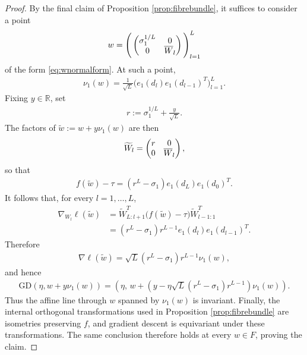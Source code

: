 \documentclass{article}
\newcommand{\RB}{\mathbb{R}}
\newcommand{\GD}{\mathrm{GD}}
\newcommand{\bW}{\smash{\overline{W}}\vphantom{W}}
\theoremstyle{plain}
\theoremstyle{definition}
\theoremstyle{remark}
\begin{document}
\begin{proof}
    By the final claim of Proposition \ref{prop:fibrebundle}, it suffices to consider a point
    \begin{align}
        w
        =
        \Bigg(
        \begin{pmatrix}
            \sigma_1^{1/L}&0\\
            0&\bW_l
        \end{pmatrix}
        \Bigg)_{l=1}^L
    \end{align}
    of the form \eqref{eq:wnormalform}. At such a point,
    \begin{align}
        \nu_1(w)
        =
        \frac{1}{\sqrt L}
        \big(e_1(d_l)e_1(d_{l-1})^T\big)_{l=1}^L.
    \end{align}
    Fixing $y\in\RB$, set
    \begin{align}
        r:=\sigma_1^{1/L}+\frac{y}{\sqrt L}.
    \end{align}
    The factors of $\widetilde w:=w+y\nu_1(w)$ are then
    \begin{align}
        \widetilde W_l
        =
        \begin{pmatrix}
            r&0\\
            0&\bW_l
        \end{pmatrix},
    \end{align}
    so that
    \begin{align}
        f(\widetilde w)-\tau
        =
        (r^L-\sigma_1)e_1(d_L)e_1(d_0)^T.
    \end{align}
    It follows that, for every $l=1,\dots,L$,
    \begin{align}
        \nabla_{W_l}\ell(\widetilde w)
        &=
        \widetilde W_{L:l+1}^T
        \big(f(\widetilde w)-\tau\big)
        \widetilde W_{l-1:1}^T\\
        &=
        (r^L-\sigma_1)r^{L-1}
        e_1(d_l)e_1(d_{l-1})^T.
    \end{align}
    Therefore
    \begin{align}
        \nabla\ell(\widetilde w)
        =
        \sqrt L(r^L-\sigma_1)r^{L-1}\nu_1(w),
    \end{align}
    and hence
    \begin{align}
        \GD(\eta,w+y\nu_1(w))
        =
        \left(
        \eta,\,
        w+
        \left(
        y-\eta\sqrt L(r^L-\sigma_1)r^{L-1}
        \right)\nu_1(w)
        \right).
    \end{align}
    Thus the affine line through $w$ spanned by $\nu_1(w)$ is invariant. Finally, the internal orthogonal transformations used in Proposition \ref{prop:fibrebundle} are isometries preserving $f$, and gradient descent is equivariant under these transformations. The same conclusion therefore holds at every $w\in F$, proving the claim.
\end{proof}
\end{document}
